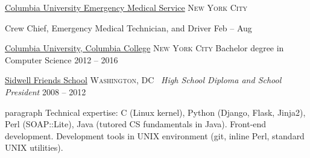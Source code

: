 \documentclass[10pt,a4paper]{article}
\begin{document}

\headedsection
  {\href{http://www.thehealthagency.com}{Columbia University Emergency Medical
Service}}
  {\textsc{New York City}} {%

  \headedsubsection
    {Crew Chief, Emergency Medical Technician, and Driver}
    {Feb  -- Aug }
    {}


}

\spacedhrule{-0.2em}{-0.4em}


\headedsection
  {\href{http://www.eur.nl/english}{Columbia University, Columbia College}}
  {\textsc{New York City}} {%
  \headedsubsection
    {Bachelor degree in Computer Science}
    {2012 -- 2016}
    {}
}

\headedsection
  {\href{http://www.tudelft.nl/en}{Sidwell Friends School}}
  {\textsc{Washington, DC}} {%
  \headedsubsection
    { \textnormal{\textit{~High School Diploma and School President}}}
    {2008 -- 2012} {}
}



\spacedhrule{0.5em}{-0.4em}


\inlineheadsection  %
paragraph
  {Technical expertise:}
  {C (Linux kernel), Python (Django, Flask, Jinja2), Perl (SOAP::Lite), Java
(tutored CS fundamentals in Java). Front-end development. Development tools in
UNIX environment (git, inline Perl, standard UNIX utilities).}
\end{document}
